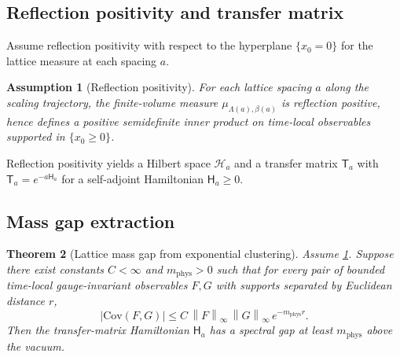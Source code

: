 \documentclass[11pt]{article}
\newtheorem{theorem}{Theorem}[section]
\newtheorem{assumption}[theorem]{Assumption}
\theoremstyle{definition}
\newcommand{\Cov}{\mathrm{Cov}}
\newcommand{\1}{\mathbf{1}}
\newcommand{\norm}[1]{\left\lVert#1\right\rVert}
\begin{document}
\subsection{Reflection positivity and transfer matrix}
Assume reflection positivity with respect to the hyperplane $\{x_0=0\}$ for the lattice measure at each spacing $a$.

\begin{assumption}[Reflection positivity]\label{ass:RP}
For each lattice spacing $a$ along the scaling trajectory, the finite-volume measure $\mu_{\Lambda(a),\beta(a)}$ is reflection positive, hence defines a positive semidefinite inner product on time-local observables supported in $\{x_0\ge 0\}$.
\end{assumption}

Reflection positivity yields a Hilbert space $\mathcal{H}_a$ and a transfer matrix $\mathsf{T}_a$ with $\mathsf{T}_a=e^{-a\mathsf{H}_a}$ for a self-adjoint Hamiltonian $\mathsf{H}_a\ge 0$.

\subsection{Mass gap extraction}

\begin{theorem}[Lattice mass gap from exponential clustering]\label{thm:lattice_gap}
Assume \ref{ass:RP}. Suppose there exist constants $C<\infty$ and $m_{\mathrm{phys}}>0$ such that for every pair of bounded time-local gauge-invariant observables $F,G$ with supports separated by Euclidean distance $r$,
\begin{equation}\label{eq:exp_cluster_phys}
\big|\Cov(F,G)\big|\le C\,\norm{F}_\infty\,\norm{G}_\infty\,e^{-m_{\mathrm{phys}} r}.
\end{equation}
Then the transfer-matrix Hamiltonian $\mathsf{H}_a$ has a spectral gap at least $m_{\mathrm{phys}}$ above the vacuum.
\end{theorem}
\end{document}
